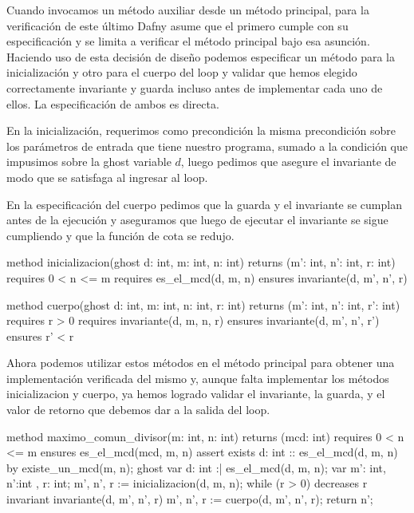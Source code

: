 \documentclass[12pt, a4paper, openany, fleqn]{book}
\begin{document}
    Cuando invocamos un método auxiliar desde un método principal, para la verificación de este último Dafny asume que el primero cumple con su especificación y se limita a verificar el método principal bajo esa asunción. Haciendo uso de esta decisión de diseño podemos especificar un método para la inicialización y otro para el cuerpo del loop y validar que hemos elegido correctamente invariante y guarda incluso antes de implementar cada uno de ellos. La especificación de ambos es directa.

    En la inicialización, requerimos como precondición la misma precondición sobre los parámetros de entrada que tiene nuestro programa, sumado a la condición que impusimos sobre la ghost variable $d$, luego pedimos que asegure el invariante de modo que se satisfaga al ingresar al loop.

    En la especificación del cuerpo pedimos que la guarda y el invariante se cumplan antes de la ejecución y aseguramos que luego de ejecutar el invariante se sigue cumpliendo y que la función de cota se redujo.

    \begin{dafny}
method inicializacion(ghost d: int, m: int, n: int)
    returns (m': int, n': int, r: int)
    requires 0 < n <= m
    requires es_el_mcd(d, m, n)
    ensures invariante(d, m', n', r)

method cuerpo(ghost d: int, m: int, n: int, r: int)
    returns (m': int, n': int, r': int)
    requires r > 0
    requires invariante(d, m, n, r)
    ensures invariante(d, m', n', r')
    ensures r' < r
    \end{dafny}

    Ahora podemos utilizar estos métodos  en el método principal para obtener una implementación verificada del mismo y, aunque falta implementar los métodos inicializacion y cuerpo, ya hemos logrado validar el invariante, la guarda, y el valor de retorno que debemos dar a la salida del loop.

    \begin{dafny}
method maximo_comun_divisor(m: int, n: int) returns (mcd: int)
    requires 0 < n <= m
    ensures es_el_mcd(mcd, m, n)
{
    assert exists d: int :: es_el_mcd(d, m, n) by {
        existe_un_mcd(m, n);
    }
    ghost var d: int :| es_el_mcd(d, m, n);
    var m': int, n':int , r: int;
    m', n', r := inicializacion(d, m, n);
    while (r > 0)
        decreases r
        invariant invariante(d, m', n', r)
    {
         m', n', r := cuerpo(d, m', n', r);
    }
    return n';
}
    \end{dafny}
\end{document}

